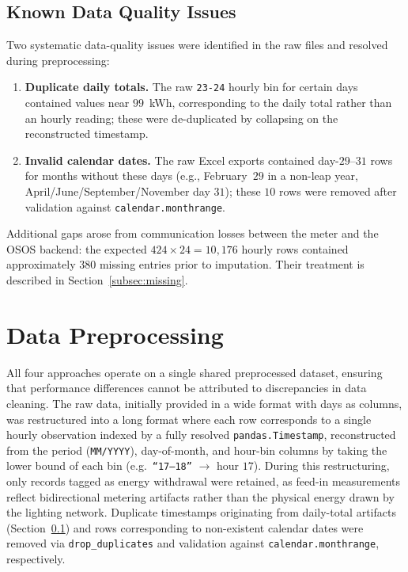 \documentclass{article}
\begin{document}
\subsection{Known Data Quality Issues}
\label{subsec:quality}
Two systematic data-quality issues were identified in the raw files and resolved during preprocessing:

\begin{enumerate}[leftmargin=1.5em,itemsep=2pt]
  \item \textbf{Duplicate daily totals.} The raw \texttt{23-24} hourly bin for certain days contained values near $99$~kWh, corresponding to the daily total rather than an hourly reading; these were de-duplicated by collapsing on the reconstructed timestamp.
  \item \textbf{Invalid calendar dates.} The raw Excel exports contained day-$29$--$31$ rows for months without these days (e.g., February~$29$ in a non-leap year, April/June/September/November day $31$); these $10$ rows were removed after validation against \texttt{calendar.monthrange}.
\end{enumerate}

Additional gaps arose from communication losses between the meter and the OSOS backend: the expected $424 \times 24 = 10{,}176$ hourly rows contained approximately $380$ missing entries prior to imputation. Their treatment is described in Section~\ref{subsec:missing}.
\section{Data Preprocessing}\label{sec:preprocessing}
All four approaches operate on a single shared preprocessed dataset, ensuring that performance differences cannot be attributed to discrepancies in data cleaning. The raw data, initially provided in a wide format with days as columns, was restructured into a long format where each row corresponds to a single hourly observation indexed by a fully resolved \texttt{pandas.Timestamp}, reconstructed from the period (\texttt{MM/YYYY}), day-of-month, and hour-bin columns by taking the lower bound of each bin (e.g.\ \texttt{``17--18''} $\rightarrow$ hour $17$). During this restructuring, only records tagged as energy withdrawal were retained, as feed-in measurements reflect bidirectional metering artifacts rather than the physical energy drawn by the lighting network. Duplicate timestamps originating from daily-total artifacts (Section~\ref{subsec:quality}) and rows corresponding to non-existent calendar dates were removed via \texttt{drop\_duplicates} and validation against \texttt{calendar.monthrange}, respectively.
\end{document}

